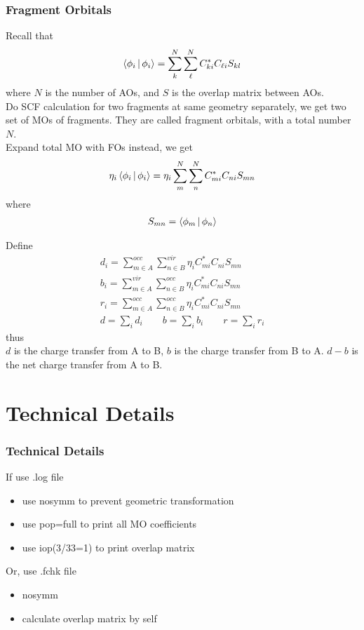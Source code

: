 \documentclass[10pt,aspectratio=43]{beamer}
\newcommand{\code}[1]{\colorbox{codegray}{{\Consolas#1}}}
\numberwithin{equation}{section}
\begin{document}
\begin{frame}
\frametitle{Fragment Orbitals}
Recall that
\begin{equation}\label{key}
\Braket{\phi_i | \phi_i} = \sum_k^N \sum_\ell^N C_{ki}^* C_{\ell i} S_{kl}
\end{equation}
where $ N $ is the number of AOs, and $ S $ is the overlap matrix between AOs. \\
Do SCF calculation for two fragments at same geometry separately, we get two set of MOs of fragments. They are called fragment orbitals, with a total number $ N $.\\
Expand total MO with FOs instead, we get
\begin{equation}\label{key}
\eta_i\Braket{\phi_i | \phi_i} = \eta_i\sum_m^N \sum_n^N C_{mi}^* C_{ni} S_{mn}
\end{equation}
where
\begin{align}\label{key}
S_{mn} = \Braket{\phi_m | \phi_n}
\end{align}

\end{frame}

\begin{frame}
Define
\begin{align}
d_i = \sum_{m\in A}^{occ} \sum_{n\in B}^{vir} \eta_i C_{mi}^* C_{ni} S_{mn}\\
b_i = \sum_{m\in A}^{vir} \sum_{n\in B}^{occ} \eta_i C_{mi}^* C_{ni} S_{mn}\\
r_i = \sum_{m\in A}^{occ} \sum_{n\in B}^{occ} \eta_i C_{mi}^* C_{ni} S_{mn}\\
d = \sum_i d_i \qquad b = \sum_i b_i \qquad r = \sum_i r_i
\end{align}
thus\\
$ d $ is the charge transfer from A to B, $ b $ is the charge transfer from B to A. $ d-b $ is the net charge transfer from A to B.

\end{frame}

\section{Technical Details}
\begin{frame}
\frametitle{Technical Details}
If use \code{.log} file
\begin{itemize}
	\item use \code{nosymm} to prevent geometric transformation
	\item use \code{pop=full} to print all MO coefficients
	\item use \code{iop(3/33=1)} to print overlap matrix
\end{itemize}
Or, use \code{.fchk} file
\begin{itemize}
	\item \code{nosymm}
	\item calculate overlap matrix by self
\end{itemize}

\end{frame}
\end{document}
